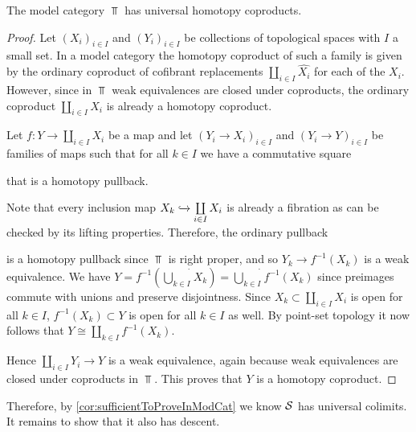 \begin{lemma}\label{lem:topUniversalCoproduct}
    The model category $\Top$ has universal homotopy coproducts.
    \begin{proof}
        	Let $\left(X_i\right)_{i\in I}$ and $\left(Y_i\right)_{i\in I}$ be collections of topological spaces with $I$ a small set. 
            In a model category the homotopy coproduct of such a family is given by the ordinary coproduct of cofibrant replacements $\coprod\limits_{i\in I}\widehat{X_i}$ for each of the $X_i$.
            However, since in $\Top$ weak equivalences are closed under coproducts, the ordinary coproduct $\coprod\limits_{i\in I}X_i$ is already a homotopy coproduct.

            Let $f\colon Y\to\coprod\limits_{i\in I}X_i$ be a map and let $\left(Y_i\to X_i\right)_{i\in I}$ and $\left(Y_i\to Y\right)_{i\in I}$ be families of maps such that for all $k\in I$ we have a commutative square
            \begin{center}
            \end{center}
            that is a homotopy pullback.

            Note that every inclusion map $X_k\xhookrightarrow{}\coprod\limits_{i\in I} X_i$ is already a fibration as can be checked by its lifting properties.
            Therefore, the ordinary pullback
            \begin{center}
            \end{center}
            is a homotopy pullback since $\Top$ is right proper, and so $Y_k\to f^{-1}(X_k)$ is a weak equivalence.
            We have $Y=f^{-1}\left(\dot{\bigcup\limits_{k\in I}} X_k\right)=\dot{\bigcup\limits_{k\in I}}f^{-1}(X_k)$ since preimages commute with unions and preserve disjointness.
            Since $X_k\subset\coprod\limits_{i\in I} X_i$ is open for all $k\in I$, $f^{-1}(X_k)\subset Y$ is open for all $k\in I$ as well. 
            By point-set topology it now follows that $Y\cong\coprod\limits_{k\in I}f^{-1}(X_k)$.
            
            Hence $\coprod\limits_{i\in I}Y_i\to Y$ is a weak equivalence, again because weak equivalences are closed under coproducts in $\Top$.
            This proves that $Y$ is a homotopy coproduct.
    \end{proof}
\end{lemma}
Therefore, by \cref{cor:sufficientToProveInModCat} we know $\mathcal{S}$ has universal colimits.
It remains to show that it also has descent.
